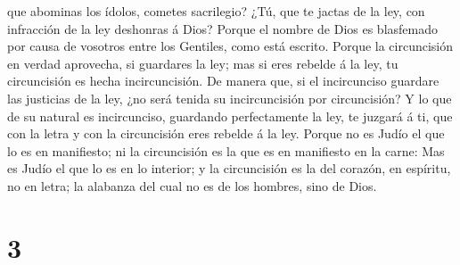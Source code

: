 que abominas los ídolos, cometes sacrilegio?  ¿Tú, que te
jactas de la ley, con infracción de la ley deshonras á Dios?
 Porque el nombre de Dios es blasfemado por causa de
vosotros entre los Gentiles, como está escrito.  Porque la
circuncisión en verdad aprovecha, si guardares la ley; mas si eres
rebelde á la ley, tu circuncisión es hecha incircuncisión. 
De manera que, si el incircunciso guardare las justicias de la ley, ¿no
será tenida su incircuncisión por circuncisión?  Y lo que
de su natural es incircunciso, guardando perfectamente la ley, te
juzgará á ti, que con la letra y con la circuncisión eres rebelde á la
ley.  Porque no es Judío el que lo es en manifiesto; ni la
circuncisión es la que es en manifiesto en la carne:  Mas
es Judío el que lo es en lo interior; y la circuncisión es la del
corazón, en espíritu, no en letra; la alabanza del cual no es de los
hombres, sino de Dios.

\hypertarget{section-2}{%
\section{3}\label{section-2}}

